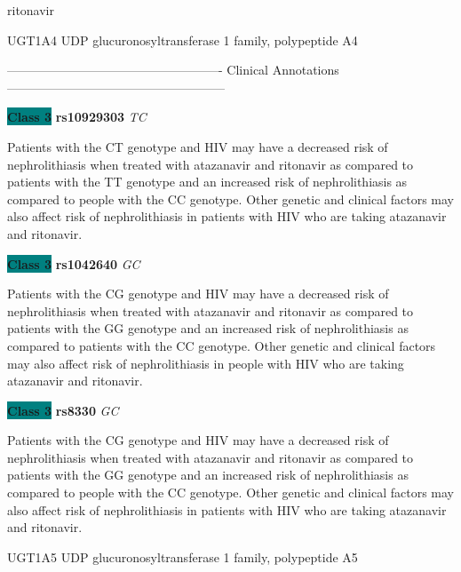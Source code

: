 \documentclass{resume} %
\begin{document}
\begin{rSection}{ ritonavir }
\begin{rSubsection}{ UGT1A4 }{ UDP glucuronosyltransferase 1 family, polypeptide A4 }{}{}
\item[] ---------------------------------------------------- Clinical Annotations -----------------------------------------------------\newline
\item \textbf{\colorbox{teal} {Class 3}} \textbf{ rs10929303 } \textit{ TC }
\item[] Patients with the CT genotype and HIV may have a decreased risk of nephrolithiasis when treated with atazanavir and ritonavir as compared to patients with the TT genotype and an increased risk of nephrolithiasis as compared to people with the CC genotype. Other genetic and clinical factors may also affect risk of nephrolithiasis in patients with HIV who are taking atazanavir and ritonavir. \item \textbf{\colorbox{teal} {Class 3}} \textbf{ rs1042640 } \textit{ GC }
\item[] Patients with the CG genotype and HIV may have a decreased risk of nephrolithiasis when treated with atazanavir and ritonavir as compared to patients with the GG genotype and an increased risk of nephrolithiasis as compared to patients with the CC genotype. Other genetic and clinical factors may also affect risk of nephrolithiasis in people with HIV who are taking atazanavir and ritonavir.\item \textbf{\colorbox{teal} {Class 3}} \textbf{ rs8330 } \textit{ GC }
\item[] Patients with the CG genotype and HIV may have a decreased risk of nephrolithiasis when treated with atazanavir and ritonavir as compared to patients with the GG genotype and an increased risk of nephrolithiasis as compared to people with the CC genotype. Other genetic and clinical factors may also affect risk of nephrolithiasis in patients with HIV who are taking atazanavir and ritonavir.
\end{rSubsection}\begin{rSubsection}{ UGT1A5 }{ UDP glucuronosyltransferase 1 family, polypeptide A5 }{}{}
\item[]


\end{rSubsection}
\end{rSection}
\end{document}
